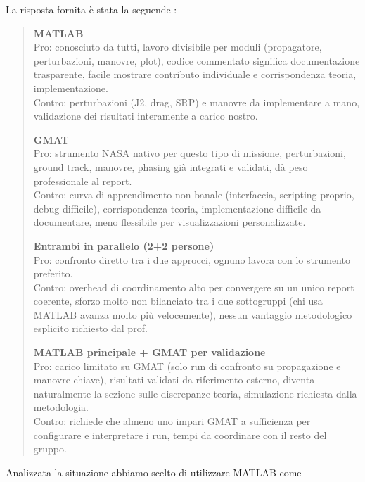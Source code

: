\documentclass[12pt, a4paper]{article}
\begin{document}
La risposta fornita è stata la seguende :

\begin{quote}
    \itshape  %
    \sffamily %
    
    \textbf{MATLAB} \\
    Pro: conosciuto da tutti, lavoro divisibile per moduli (propagatore, perturbazioni, manovre, plot), codice commentato significa documentazione trasparente, facile mostrare contributo individuale e corrispondenza teoria, implementazione. \\
    Contro: perturbazioni (J2, drag, SRP) e manovre da implementare a mano, validazione dei risultati interamente a carico nostro.

    \medskip 

    \textbf{GMAT} \\
    Pro: strumento NASA nativo per questo tipo di missione, perturbazioni, ground track, manovre, phasing già integrati e validati, dà peso professionale al report. \\
    Contro: curva di apprendimento non banale (interfaccia, scripting proprio, debug difficile), corrispondenza teoria, implementazione difficile da documentare, meno flessibile per visualizzazioni personalizzate.

    \medskip

    \textbf{Entrambi in parallelo (2+2 persone)} \\
    Pro: confronto diretto tra i due approcci, ognuno lavora con lo strumento preferito. \\
    Contro: overhead di coordinamento alto per convergere su un unico report coerente, sforzo molto non bilanciato tra i due sottogruppi (chi usa MATLAB avanza molto più velocemente), nessun vantaggio metodologico esplicito richiesto dal prof.

    \medskip

    \textbf{MATLAB principale + GMAT per validazione} \\
    Pro: carico limitato su GMAT (solo run di confronto su propagazione e manovre chiave), risultati validati da riferimento esterno, diventa naturalmente la sezione sulle discrepanze teoria, simulazione richiesta dalla metodologia. \\
    Contro: richiede che almeno uno impari GMAT a sufficienza per configurare e interpretare i run, tempi da coordinare con il resto del gruppo.
\end{quote}
Analizzata la situazione abbiamo scelto di utilizzare MATLAB come 
\end{document}
